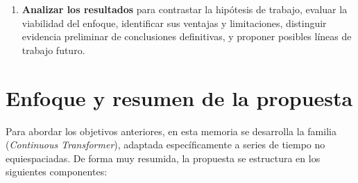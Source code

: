 \begin{enumerate}
    \begin{itemize}
        \item La familia de arquitecturas propuesta con encoding temporal continuo.
        \item Baselines simples, ablaciones temporales, arquitecturas de consulta continua y modelos del estado del arte adaptados a observaciones irregulares.
    \end{itemize}
    utilizando métricas de error de regresión (MSE, RMSE, MAE, MAPE), análisis de costo computacional y comparaciones emparejadas cuando exista cobertura experimental suficiente.
    \item \textbf{Analizar los resultados} para contrastar la hipótesis de trabajo, evaluar la viabilidad del enfoque, identificar sus ventajas y limitaciones, distinguir evidencia preliminar de conclusiones definitivas, y proponer posibles líneas de trabajo futuro.
\end{enumerate}

\section{Enfoque y resumen de la propuesta}

Para abordar los objetivos anteriores, en esta memoria se desarrolla la familia \CTTransformer (\textit{Continuous Transformer}), adaptada específicamente a series de tiempo no equiespaciadas. De forma muy resumida, la propuesta se estructura en los siguientes componentes:


